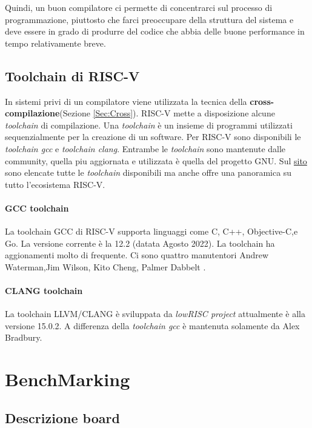 \documentclass[12pt,a4paper]{report}
\begin{document}
Quindi, un buon compilatore ci permette di concentrarci sul processo di programmazione,  piuttosto che farci preoccupare della struttura del sistema e deve essere in grado di produrre del codice che abbia delle buone performance in tempo relativamente breve.


\section{Toolchain di RISC-V}
In sistemi privi di un compilatore viene utilizzata la tecnica della \textbf{cross-compilazione}(Sezione \ref{Sec:Cross}).  RISC-V mette a disposizione alcune \textit{toolchain} di compilazione. Una \textit{toolchain} è un insieme di programmi utilizzati sequenzialmente per la creazione di un software. Per RISC-V sono disponibili le \textit{toolchain gcc}\cite{toolchain_gcc} e \textit{toolchain clang}\cite{toolchain_clang}. Entrambe le \textit{toolchain} sono mantenute dalle community, quella piu aggiornata e utilizzata è quella del progetto GNU.  Sul \href{https://wiki.riscv.org/display/HOME/RISC-V+Software+Ecosystem}{sito} sono elencate tutte le \textit{toolchain} disponibili ma anche offre una panoramica su tutto l'ecosistema RISC-V.


\subsubsection{GCC toolchain}
La toolchain GCC di RISC-V supporta linguaggi come C, C++, Objective-C,e Go. La versione corrente è la 12.2 (datata Agosto 2022).  La toolchain ha aggionamenti molto di frequente.  Ci sono quattro manutentori Andrew Waterman,Jim Wilson, Kito Cheng, Palmer Dabbelt .

\subsubsection{CLANG toolchain}
La toolchain LLVM/CLANG è sviluppata da \textit{lowRISC project} attualmente è alla versione 15.0.2. A differenza della \textit{toolchain gcc} è mantenuta solamente da Alex Bradbury.


\chapter{BenchMarking}
\section{Descrizione board}
\end{document}
